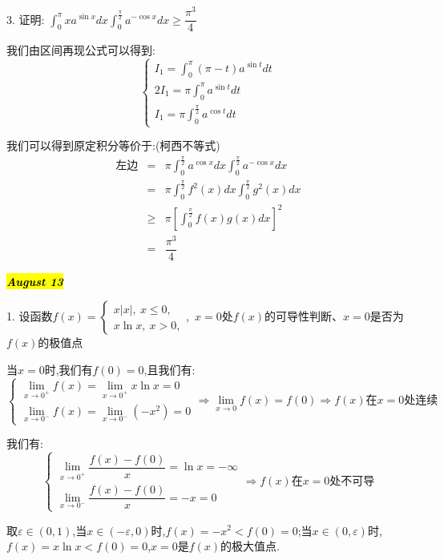3. 证明:  $\int_{0}^{\pi}xa^{\sin x}dx\int_{0}^{\frac{\pi}{2}}a^{-\cos x}dx\geq \dfrac{\pi^3}{4}$
\begin{solution}

	我们由区间再现公式可以得到:
	$$\left\lbrace 
	\begin{array}{l}
		I_{1}=\int_{0}^{\pi}(\pi-t)a^{\sin t}dt\\
		2I_{1}=\pi\int_{0}^{\pi}a^{\sin t}dt\\
		I_{1}=\pi\int_{0}^{\frac{\pi}{2}}a^{\cos t}dt
	\end{array}
	\right. $$
	
	我们可以得到原定积分等价于:(柯西不等式)
	\begin{eqnarray*}
		\text{左边}&=&\pi\int_{0}^{\frac{\pi}{2}}a^{\cos x}dx\int_{0}^{\frac{\pi}{2}}a^{-\cos x}dx\\
		&=&\pi\int_{0}^{\frac{\pi}{2}}f^{2}(x)dx\int_{0}^{\frac{\pi}{2}}g^{2}(x)dx\\
		&\geq &\pi \left[ \int_{0}^{\frac{\pi}{2}}f(x)g(x)dx\right]^2\\
		&=&\dfrac{\pi^3}{4} 
	\end{eqnarray*}
\end{solution}

\hl{\textbf{\textit{August 13}}}

1. 设函数$f(x)=\left\lbrace
\begin{array}{l}
	x|x|,\ x\leq 0,\\
	x\ln x,\ x>0,
\end{array}
\right. $,\ $x=0$处$f(x)$的可导性判断、$x=0$是否为$f(x)$的极值点
\begin{solution}

	当$x=0$时,我们有$f(0)=0$,且我们有:  
	$$\left\lbrace
	\begin{array}{l}
		\lim\limits_{x\rightarrow 0^{+}}f(x)=\lim\limits_{x\rightarrow 0^{+}}x\ln x=0\\
		\lim\limits_{x\rightarrow 0^{-}}f(x)=\lim\limits_{x\rightarrow 0^{-}}(-x^2)=0
	\end{array}
	\right. \Rightarrow \lim\limits_{x\rightarrow 0}f(x)=f(0)\Rightarrow f(x)\text{在}x=0\text{处连续}$$
	
	我们有:  
	$$\left\lbrace
	\begin{array}{l}
		\lim\limits_{x\rightarrow 0^{+}}\dfrac{f(x)-f(0)}{x}=\ln x=-\infty\\
		\lim\limits_{x\rightarrow 0^{-}}\dfrac{f(x)-f(0)}{x}=-x=0
	\end{array}
	\right. \Rightarrow f(x)\text{在}x=0\text{处不可导}$$
	
	取$\varepsilon\in(0,1)$,当$x\in(-\varepsilon,0)$时,$f(x)=-x^2<f(0)=0$;当$x\in(0,\varepsilon)$时,$f(x)=x\ln x<f(0)=0$,$x=0$是$f(x)$的极大值点.
\end{solution}

